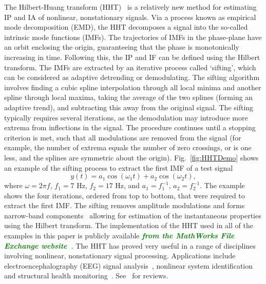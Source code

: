 \documentclass[a4paper]{IEEEtran}
\newcommand{\dean}[1]{\textsf{\emph{\textbf{\textcolor{green}{#1}}}}}
\begin{document}
The Hilbert-Huang transform (HHT)~\cite{Huang1998} is a relatively new method for estimating IP and IA of nonlinear, nonstationary signals. Via a process known as empirical mode decomposition (EMD), the HHT decomposes a signal into the so-called intrinsic mode functions (IMFs). The trajectories of IMFs in the phase-plane have an orbit enclosing the origin, guaranteeing that the phase is monotonically increasing in time. Following this, the IP and IF can be defined using the Hilbert transform. The IMFs are extracted by an iterative process called `sifting', which can be considered as adaptive detrending or demodulating. The sifting algorithm involves finding a cubic spline interpolation through all local minima and another spline through local maxima, taking the average of the two splines (forming an adaptive trend), and subtracting this away from the original signal. The sifting typically requires several iterations, as the demodulation may introduce more extrema from inflections in the signal. The procedure continues until a stopping criterion is met, such that all modulations are removed from the signal (for example, the number of extrema equals the number of zero crossings, or is one less, and the splines are symmetric about the origin). Fig.~\ref{fig:HHTDemo} shows an example of the sifting process to extract the first IMF of a test signal
\begin{equation}\label{eq:FirstTestSig}
y\left( t \right) = a_1\cos \left(\omega_1t\right) + a_2\cos \left( \omega _2t \right),
\end{equation}
where $\omega = 2\pi f$, $f_1 = 7$ Hz, $f_2 = 17$ Hz, and $a_1 = f_1^{-1}$, $a_2=f_2^{-1}$. The example shows the four iterations, ordered from top to bottom, that were required to extract the first IMF. The sifting removes amplitude modulations and forms narrow-band components~\cite{Huang1998} allowing for estimation of the instantaneous properties using the Hilbert transform. The implementation of the HHT used in all of the examples in this paper is publicly available \dean{from the MathWorks File Exchange website~\cite{Tan2008}}. The HHT has proved very useful in a range of disciplines involving nonlinear, nonstationary signal processing. Applications include electroencephalography (EEG) signal analysis~\cite{Wang2008}, nonlinear system identification and structural health monitoring~\cite{Pai2008}. See~\cite{Huang2008,Huang2005a} for reviews.
\end{document}
